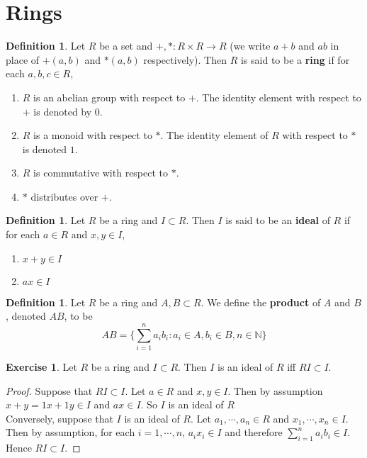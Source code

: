 \documentclass[12pt]{amsart}
\theoremstyle{definition}
\newtheorem{defn}[definition]{Definition}
\newtheorem{ex}[definition]{Exercise}
\newcommand{\N}{\mathbb{N}}
\begin{document}
	
	
	
	
	
	
	
	
	
	
	
	
	
	\newpage
	\section{Rings}
	
	\begin{defn}
	Let $R$ be a set and $+, *: R \times R 				
	\rightarrow R$ (we write $a+b$ and 
	$ab$ in place of $+(a,b)$ and $*(a,b)$ respectively).
	Then $R$ is said to be a \textbf{ring} if for each 
	$a,b,c \in R$,
	\begin{enumerate}
	\item $R$ is an abelian group with respect to $+$.
	 The identity element with respect to $+$ is denoted
	 by $0$.
	\item $R$ is a monoid with respect to $*$. The  
	identity element of $R$ with respect to $*$ is denoted $1$. 
	\item $R$ is commutative with respect to $*$.
	\item $*$ distributes over $+$.
	\end{enumerate}
	\end{defn}
	
	\begin{defn}
	Let $R$ be a ring and $I \subset R$. Then $I$ is said 
	to be an \textbf{ideal} of $R$ if for each $a \in R$ and $x,y \in I$,
	\begin{enumerate}
	\item  $x + y \in I$
	\item  $ax \in I$
	\end{enumerate}
	\end{defn}
	
	\begin{defn}
	Let $R$ be a ring and $A,B \subset R$. We define the \textbf{product} of $A$ and $B$, denoted $AB$, to be $$AB = \bigg \{\sum_{i=1}^n a_ib_i: a_i \in A, b_i \in B, n \in \N \bigg \}$$
	\end{defn}	
	
	\begin{ex}
	Let $R$ be a ring and $I \subset R$. Then $I$ is an ideal of $R$ iff $RI \subset I$. 
	\end{ex}
	
	\begin{proof}
	Suppose that $RI \subset I$. Let $a \in R$ and $x,y \in I$. Then by assumption $x + y = 1x + 1y \in I$ and $ax \in I$. So $I$ is an ideal of $R$\\
	Conversely, suppose that $I$ is an ideal of $R$. Let $a_1, \cdots, a_n \in R$ and $x_1, \cdots, x_n \in I$. Then by assumption, for each $i = 1, \cdots, n$, $a_ix_i \in I$ and therefore $\sum\limits_{i=1}^n a_ib_i \in I$. Hence $RI \subset I$.
	\end{proof}
	
\end{document}
